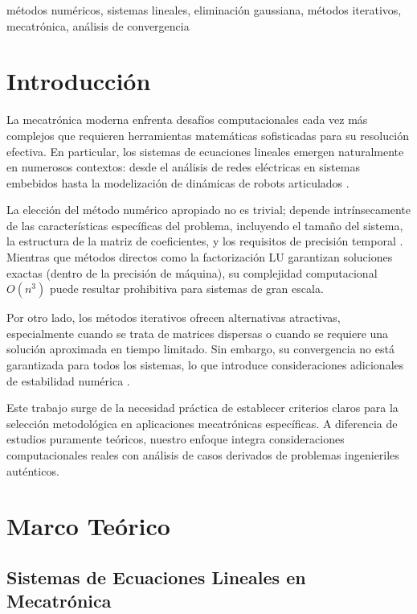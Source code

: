 \documentclass[conference]{IEEEtran}
\begin{document}
\begin{IEEEkeywords}
métodos numéricos, sistemas lineales, eliminación gaussiana, métodos iterativos, mecatrónica, análisis de convergencia
\end{IEEEkeywords}

\section{Introducción}

La mecatrónica moderna enfrenta desafíos computacionales cada vez más complejos que requieren herramientas matemáticas sofisticadas para su resolución efectiva. En particular, los sistemas de ecuaciones lineales emergen naturalmente en numerosos contextos: desde el análisis de redes eléctricas en sistemas embebidos hasta la modelización de dinámicas de robots articulados \cite{burden2015numerical}. 

La elección del método numérico apropiado no es trivial; depende intrínsecamente de las características específicas del problema, incluyendo el tamaño del sistema, la estructura de la matriz de coeficientes, y los requisitos de precisión temporal \cite{heath2018scientific}. Mientras que métodos directos como la factorización LU garantizan soluciones exactas (dentro de la precisión de máquina), su complejidad computacional $O(n^3)$ puede resultar prohibitiva para sistemas de gran escala.

Por otro lado, los métodos iterativos ofrecen alternativas atractivas, especialmente cuando se trata de matrices dispersas o cuando se requiere una solución aproximada en tiempo limitado. Sin embargo, su convergencia no está garantizada para todos los sistemas, lo que introduce consideraciones adicionales de estabilidad numérica \cite{trefethen1997numerical}.

Este trabajo surge de la necesidad práctica de establecer criterios claros para la selección metodológica en aplicaciones mecatrónicas específicas. A diferencia de estudios puramente teóricos, nuestro enfoque integra consideraciones computacionales reales con análisis de casos derivados de problemas ingenieriles auténticos.

\section{Marco Teórico}

\subsection{Sistemas de Ecuaciones Lineales en Mecatrónica}
\end{document}
